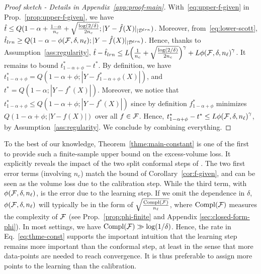 \begin{proof}[Proof sketch - Details in Appendix~\ref{app:proof-main}]
With~\eqref{eq:upper-f-given} in Prop.~\ref{prop:upper-f-given}, we have $\hat{t} \leq Q(1-\alpha + \frac{1-\alpha}{n_c}+\sqrt{\frac{\log(2/\delta)}{2n_{c}}}; |Y-\hat{f}(X)|_{|{\cal D}^{lrn}})$. Moreover, from~\eqref{eq:lower-scott}, $\hat{t}_{lrn}\geq Q(1-\alpha - {\phi(\mathcal{F},\delta,n_\ell)}; |Y-\hat{f}(X)|_{|{\cal D}^{lrn}})$. Hence, thanks to Assumption~\ref{ass:regularity}, $\hat{t} - \hat{t}_{lrn} \leq L\Big(\frac{1}{n_{c}} +\sqrt{\frac{\log(2/\delta)}{2n_{c}}}\Big)^{\gamma} + L{\phi(\mathcal{F},\delta,n_\ell)}^\gamma$.
It remains to bound $t_{1-\alpha+\phi}^* - t^*$. By definition, we have $t_{1-\alpha+\phi}^* = Q(1-\alpha + \phi; |Y-f_{1-\alpha+\phi}^*(X)|)$, and $t^* = Q(1-\alpha; |Y-f^*(X)|)$. Moreover, we notice that $t_{1-\alpha+\phi}^* \leq Q(1-\alpha + \phi; |Y-f^*(X)|)$ since by definition $f_{1-\alpha+\phi}^*$ minimizes $Q(1-\alpha + \phi; |Y-f(X)|)$ over all $f\in\mathcal{F}$. Hence, $t_{1-\alpha+\phi}^* - t^* \leq L{\phi(\mathcal{F},\delta,n_\ell)}^\gamma$, by Assumption~\ref{ass:regularity}. We conclude by combining everything. %
\end{proof}


To the best of our knowledge, Theorem~\ref{thme:main-constant} is one of the first to provide such a finite-sample upper bound on the excess-volume loss. It explicitly reveals the impact of the two split conformal steps of \method. The two first error terms (involving $n_c$) match the bound of Corollary~\ref{cor:f-given}, and can be seen as the volume loss due to the calibration step. While the third term, with ${\phi(\mathcal{F},\delta,n_\ell)}$, is the error due to the learning step. If we omit the dependence in $\delta$, ${\phi(\mathcal{F},\delta,n_\ell)}$ will typically be in the form of $\sqrt{\frac{\text{Compl}(\mathcal{F})}{n_\ell}}$, where $\text{Compl}(\mathcal{F})$ measures the complexity of $\mathcal{F}$ (see Prop.~\ref{prop:phi-finite} and Appendix \ref{sec:closed-form-phi}). In most settings, we have $\text{Compl}(\mathcal{F})\gg \log(1/\delta)$. Hence, the rate in Eq.~\eqref{eq:thme-const} supports the important intuition that the learning step remains more important than the conformal step, at least in the sense that more data-points are needed to reach convergence. It is thus preferable to assign more points to the learning than the calibration.

